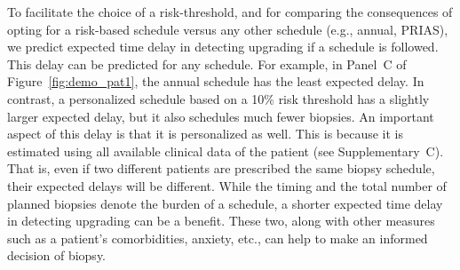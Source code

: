 To facilitate the choice of a risk-threshold, and for comparing the consequences of opting for a risk-based schedule versus any other schedule (e.g., annual, PRIAS), we predict expected time delay in detecting upgrading if a schedule is followed. This delay can be predicted for any schedule. For example, in Panel~C of Figure~\ref{fig:demo_pat1}, the annual schedule has the least expected delay. In contrast, a personalized schedule based on a 10\% risk threshold has a slightly larger expected delay, but it also schedules much fewer biopsies. An important aspect of this delay is that it is personalized as well. This is because it is estimated using all available clinical data of the patient (see Supplementary~C). That is, even if two different patients are prescribed the same biopsy schedule, their expected delays will be different. While the timing and the total number of planned biopsies denote the burden of a schedule, a shorter expected time delay in detecting upgrading can be a benefit. These two, along with other measures such as a patient's comorbidities, anxiety, etc., can help to make an informed decision of biopsy. 

